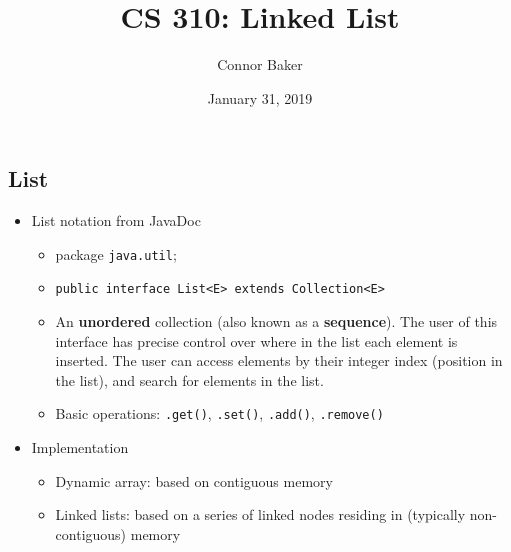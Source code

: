\documentclass[10pt]{article}
\title{CS 310: Linked List}
\author{Connor Baker}
\date{January 31, 2019}
\begin{document}
\maketitle

\subsection*{List}
\begin{itemize}
    \item List notation from JavaDoc
    \begin{itemize}
        \item package \texttt{java.util};
        \item \texttt{public interface List<E> extends Collection<E>}
        \item An \textbf{unordered} collection (also known as a \textbf{sequence}). The user of this interface has precise control over where in the list each element is inserted. The user can access elements by their integer index (position in the list), and search for elements in the list.
        \item Basic operations: \texttt{.get()}, \texttt{.set()}, \texttt{.add()}, \texttt{.remove()} 
    \end{itemize}
    \item Implementation
    \begin{itemize}
        \item Dynamic array: based on contiguous memory
        \item Linked lists: based on a series of linked nodes residing in (typically non-contiguous) memory
    \end{itemize}
\end{itemize}
\end{document}
